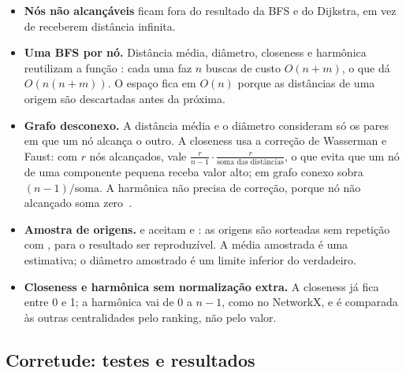 \begin{itemize}[leftmargin=*]
        grafo os vizinhos de cada nó; o sentido das arestas é resolvido pela classe .
  \item \textbf{Nós não alcançáveis} ficam fora do resultado da BFS e do Dijkstra, em vez de
        receberem distância infinita.
  \item \textbf{Uma BFS por nó.} Distância média, diâmetro, closeness e harmônica reutilizam a
        função : cada uma faz $n$ buscas de custo $O(n+m)$, o que dá $O(n(n+m))$. O
        espaço fica em $O(n)$ porque as distâncias de uma origem são descartadas antes da próxima.
  \item \textbf{Grafo desconexo.} A distância média e o diâmetro consideram só os pares em que um
        nó alcança o outro. A closeness usa a correção de Wasserman e Faust: com $r$ nós
        alcançados, vale $\frac{r}{n-1}\cdot\frac{r}{\text{soma das distâncias}}$, o que evita que
        um nó de uma componente pequena receba valor alto; em grafo conexo sobra
        $(n-1)/\text{soma}$. A harmônica não precisa de correção, porque nó não alcançado soma
        zero~\cite{boldi2014}.
  \item \textbf{Amostra de origens.}  e  aceitam
         e : as origens são sorteadas sem repetição com
        , para o resultado ser reproduzível. A média amostrada é
        uma estimativa; o diâmetro amostrado é um limite inferior do verdadeiro.
  \item \textbf{Closeness e harmônica sem normalização extra.} A closeness já fica entre 0 e 1; a
        harmônica vai de 0 a $n-1$, como no NetworkX, e é comparada às outras centralidades pelo
        ranking, não pelo valor.
\end{itemize}

\subsection{Corretude: testes e resultados}

